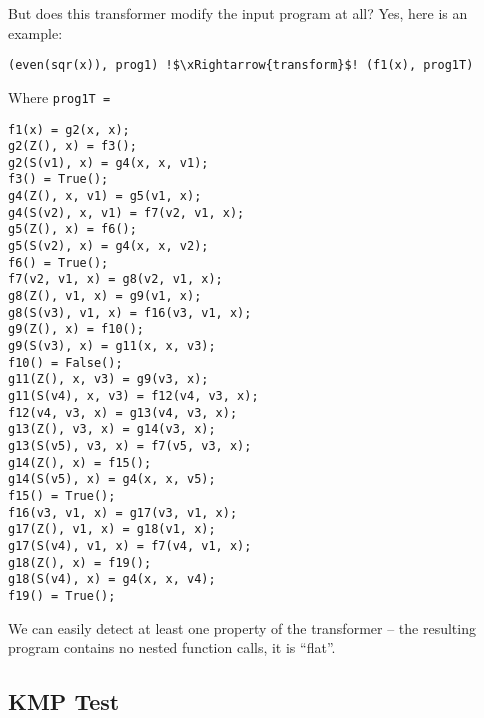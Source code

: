 But does this transformer modify the input program at all? Yes, here is an example:
\begin{lstlisting}[language=sll,escapechar=!]
(even(sqr(x)), prog1) !$\xRightarrow{transform}$! (f1(x), prog1T)
\end{lstlisting}
Where \texttt{prog1T =}
\begin{lstlisting}[language=sll]
f1(x) = g2(x, x);
g2(Z(), x) = f3();
g2(S(v1), x) = g4(x, x, v1);
f3() = True();
g4(Z(), x, v1) = g5(v1, x);
g4(S(v2), x, v1) = f7(v2, v1, x);
g5(Z(), x) = f6();
g5(S(v2), x) = g4(x, x, v2);
f6() = True();
f7(v2, v1, x) = g8(v2, v1, x);
g8(Z(), v1, x) = g9(v1, x);
g8(S(v3), v1, x) = f16(v3, v1, x);
g9(Z(), x) = f10();
g9(S(v3), x) = g11(x, x, v3);
f10() = False();
g11(Z(), x, v3) = g9(v3, x);
g11(S(v4), x, v3) = f12(v4, v3, x);
f12(v4, v3, x) = g13(v4, v3, x);
g13(Z(), v3, x) = g14(v3, x);
g13(S(v5), v3, x) = f7(v5, v3, x);
g14(Z(), x) = f15();
g14(S(v5), x) = g4(x, x, v5);
f15() = True();
f16(v3, v1, x) = g17(v3, v1, x);
g17(Z(), v1, x) = g18(v1, x);
g17(S(v4), v1, x) = f7(v4, v1, x);
g18(Z(), x) = f19();
g18(S(v4), x) = g4(x, x, v4);
f19() = True();
\end{lstlisting}

We can easily detect at least one property of the transformer -- the resulting program
contains no nested function calls, it is ``flat''.

\subsection{KMP Test}

